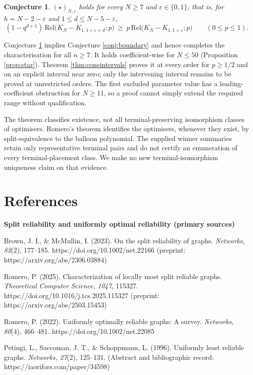 \documentclass[
  11pt,
]{article}
\newtheorem{conjecture}[theorem]{Conjecture}
\theoremstyle{definition}
\theoremstyle{remark}
\begin{document}
\begin{conjecture}\label{conj:star}
$(\star)_{N,\varepsilon}$ holds for every $N\ge 7$ and $\varepsilon\in\{0,1\}$; that is, for $h=N-2-\varepsilon$ and $1\le d\le N-5-\varepsilon$,
$$(1-q^{d+1})\,\mathrm{Rel}\bigl(K_N-K_{1,1+\varepsilon+d};p\bigr)\ \ge\ p\,\mathrm{Rel}\bigl(K_N-K_{1,1+\varepsilon};p\bigr)\qquad(0\le p\le 1).$$
\end{conjecture}

Conjecture \ref{conj:star} implies Conjecture \ref{conj:boundary} and
hence completes the characterisation for all \(n\ge7\). It holds
coefficient-wise for \(N\le50\) (Proposition \ref{prop:star}). Theorem
\ref{thm:coneintervals} proves it at every order for \(p\ge1/2\) and on
an explicit interval near zero; only the intervening interval remains to
be proved at unrestricted orders. The first excluded parameter value has
a leading-coefficient obstruction for \(N\ge11\), so a proof cannot
simply extend the required range without qualification.

The theorem classifies existence, not all terminal-preserving
isomorphism classes of optimisers. Romero's theorem identifies the
optimisers, whenever they exist, by split-equivalence to the balloon
polynomial. The supplied winner summaries retain only representative
terminal pairs and do not certify an enumeration of every
terminal-placement class. We make no new terminal-isomorphism uniqueness
claim on that evidence.

\section*{References}\label{references}

\textbf{Split reliability and uniformly optimal reliability (primary
sources)}

Brown, J. I., \& McMullin, I. (2023). On the split reliability of
graphs. \emph{Networks, 82}(2), 177--185.
https://doi.org/10.1002/net.22166 (preprint:
https://arxiv.org/abs/2306.03884)

Romero, P. (2025). Characterization of locally most split reliable
graphs. \emph{Theoretical Computer Science, 1047}, 115327.
https://doi.org/10.1016/j.tcs.2025.115327 (preprint:
https://arxiv.org/abs/2503.15453)

Romero, P. (2022). Uniformly optimally reliable graphs: A survey.
\emph{Networks, 80}(4), 466--481. https://doi.org/10.1002/net.22085

Petingi, L., Saccoman, J. T., \& Schoppmann, L. (1996). Uniformly least
reliable graphs. \emph{Networks, 27}(2), 125--131. (Abstract and
bibliographic record: https://iaorifors.com/paper/34598)
\end{document}
